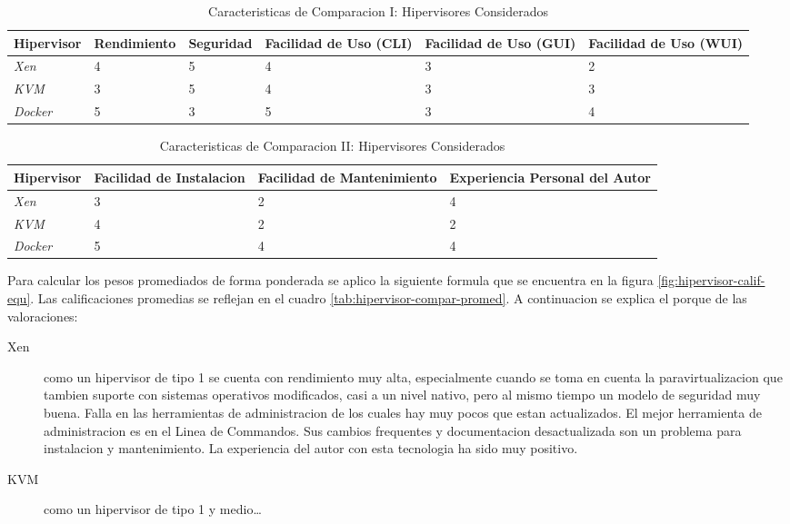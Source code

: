 \begin{table}
	\centering
	\begin{tabular}{|p{1.85cm}|p{2.25cm}|p{1.8cm}|p{1.7cm}|p{1.7cm}|p{1.7cm}|}
    	\hline
		\textbf{Hipervisor} & \textbf{Rendimiento} & \textbf{Seguridad} & \textbf{Facilidad de Uso (CLI)} & \textbf{Facilidad de Uso (GUI)} & \textbf{Facilidad de Uso (WUI)} \\
        \hline
        \textit{Xen} & 4 & 5 & 4 & 3 & 2 \\
        \hline
        \textit{KVM} & 3 & 5 & 4 & 3 & 3 \\
        \hline
        \textit{Docker} & 5 & 3 & 5 & 3 & 4 \\
        \hline
	\end{tabular}
    \caption{Caracteristicas de Comparacion I: Hipervisores Considerados}
    \label{tab:hipervisor-compar-i}
\end{table}

\begin{table}
	\centering
	\begin{tabular}{|p{1.85cm}|p{2.2cm}|p{3.0cm}|p{1.9cm}|}
    	\hline
		\textbf{Hipervisor} & \textbf{Facilidad de Instalacion} & \textbf{Facilidad de Mantenimiento} & \textbf{Experiencia Personal del Autor} \\
        \hline
        \textit{Xen} & 3 & 2 & 4 \\
        \hline
        \textit{KVM} & 4 & 2 & 2 \\
        \hline
        \textit{Docker} & 5 & 4 & 4 \\
        \hline
	\end{tabular}
    \caption{Caracteristicas de Comparacion II: Hipervisores Considerados}
    \label{tab:hipervisor-compar-ii}
\end{table}


Para calcular los pesos promediados de forma ponderada se aplico la siguiente formula que se encuentra en la figura \ref{fig:hipervisor-calif-equ}. Las calificaciones promedias se reflejan en el cuadro \ref{tab:hipervisor-compar-promed}. A continuacion se explica el porque de las valoraciones:
\begin{description}
	\item[Xen] como un hipervisor de tipo 1 se cuenta con rendimiento muy alta, especialmente cuando se toma en cuenta la paravirtualizacion que tambien suporte con sistemas operativos modificados, casi a un nivel nativo, pero al mismo tiempo un modelo de seguridad muy buena. Falla en las herramientas de administracion de los cuales hay muy pocos que estan actualizados. El mejor herramienta de administracion es en el Linea de Commandos. Sus cambios frequentes y documentacion desactualizada son un problema para instalacion y mantenimiento. La experiencia del autor con esta tecnologia ha sido muy positivo.
    \item[KVM] como un hipervisor de tipo 1 y medio\ldots %
\end{description}

